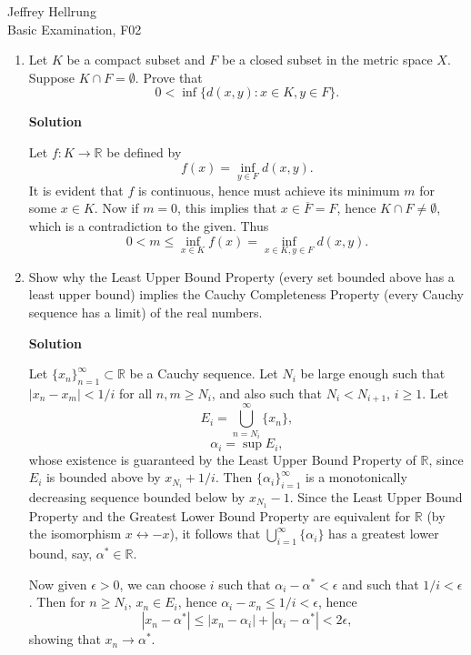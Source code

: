 \documentclass{article}
\begin{document}
\begin{flushright}
Jeffrey Hellrung \\
Basic Examination, F02 \\
\end{flushright}


\begin{enumerate}

\item Let \(K\) be a compact subset and \(F\) be a closed subset in the metric space \(X\).  Suppose \(K \cap F = \emptyset\).  Prove that
\[0 < \inf \{ d(x,y) : x \in K, y \in F \}.\]

{\bf Solution}

Let \(f : K \to \mathbb{R}\) be defined by
\[f(x) = \inf_{y \in F} d(x,y).\]
It is evident that \(f\) is continuous, hence must achieve its minimum \(m\) for some \(x \in K\).  Now if \(m = 0\), this implies that \(x \in \overline{F} = F\), hence \(K \cap F \neq \emptyset\), which is a contradiction to the given.  Thus
\[0 < m \leq \inf_{x \in K} f(x) = \inf_{x \in K, y \in F} d(x,y).\]



\item Show why the Least Upper Bound Property (every set bounded above has a least upper bound) implies the Cauchy Completeness Property (every Cauchy sequence has a limit) of the real numbers.

{\bf Solution}

Let \(\{x_n\}_{n = 1}^{\infty} \subset \mathbb{R}\) be a Cauchy sequence.  Let \(N_i\) be large enough such that \(|x_n - x_m| < 1/i\) for all \(n,m \geq N_i\), and also such that \(N_i < N_{i + 1}\), \(i \geq 1\).  Let
\[E_i = \bigcup_{n = N_i}^{\infty} \{x_n\},\]
\[\alpha_i = \sup E_i,\]
whose existence is guaranteed by the Least Upper Bound Property of \(\mathbb{R}\), since \(E_i\) is bounded above by \(x_{N_i} + 1/i\).  Then \(\{\alpha_i\}_{i = 1}^{\infty}\) is a monotonically decreasing sequence bounded below by \(x_{N_1} - 1\).  Since the Least Upper Bound Property and the Greatest Lower Bound Property are equivalent for \(\mathbb{R}\) (by the isomorphism \(x \leftrightarrow -x\)), it follows that \(\bigcup_{i = 1}^{\infty} \{\alpha_i\}\) has a greatest lower bound, say, \(\alpha^* \in \mathbb{R}\).

Now given \(\epsilon > 0\), we can choose \(i\) such that \(\alpha_i - \alpha^* < \epsilon\) and such that \(1/i < \epsilon\).  Then for \(n \geq N_i\), \(x_n \in E_i\), hence \(\alpha_i - x_n \leq 1/i < \epsilon\), hence
\[|x_n - \alpha^*| \leq |x_n - \alpha_i| + |\alpha_i - \alpha^*| < 2\epsilon,\]
showing that \(x_n \to \alpha^*\).




\end{enumerate}
\end{document}
